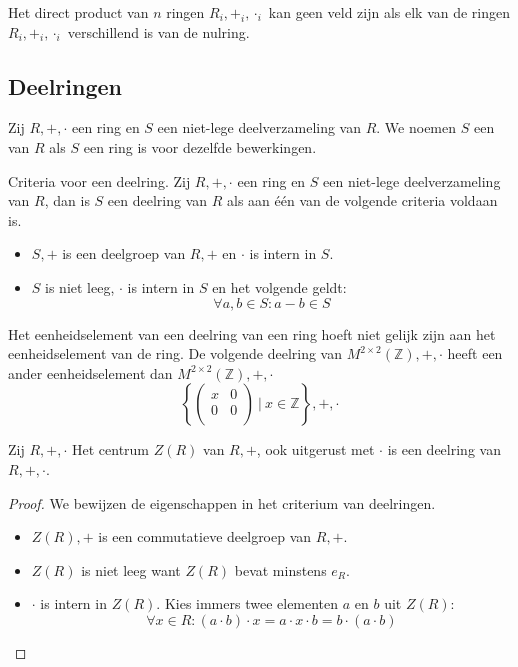 \documentclass[main.tex]{subfiles}
\begin{document}
\begin{st}
  Het direct product van $n$ ringen $R_{i},+_{i},\cdot_{i}$ kan geen veld zijn als elk van de ringen $R_{i},+_{i},\cdot_{i}$ verschillend is van de nulring.
\end{st}

\subsection{Deelringen}
\label{sec:deelringen}

\begin{de}
  Zij $R,+,\cdot$ een ring en $S$ een niet-lege deelverzameling van $R$.
  We noemen $S$ een  van $R$ als $S$ een ring is voor dezelfde bewerkingen.
\end{de}

\begin{st}
  \label{st:deelring-criteria}
  Criteria voor een deelring.
  Zij $R,+,\cdot$ een ring en $S$ een niet-lege deelverzameling van $R$, dan is $S$ een deelring van $R$ als aan \'e\'en van de volgende criteria voldaan is.
  \begin{itemize}
  \item $S,+$ is een deelgroep van $R,+$ en $\cdot$ is intern in $S$.
  \item $S$ is niet leeg, $\cdot$ is intern in $S$ en het volgende geldt:
    \[ \forall a,b \in S: a - b \in S \]
  \end{itemize}
\end{st}

\begin{opm}
  Het eenheidselement van een deelring van een ring hoeft niet gelijk zijn aan het eenheidselement van de ring.
  De volgende deelring van $M^{2\times 2}(\mathbb{Z}),+,\cdot$ heeft een ander eenheidselement dan $M^{2\times 2}(\mathbb{Z}),+,\cdot$ 
  \[
  \left\{
    \begin{pmatrix}
      x & 0\\
      0 & 0\\
    \end{pmatrix}
  \ |\ x \in \mathbb{Z}
  \right\},+,\cdot
  \]
\end{opm}

\begin{st}
  Zij $R,+,\cdot$
  Het centrum $Z(R)$ van $R,+$, ook uitgerust met $\cdot$ is een deelring van $R,+,\cdot$.
  \begin{proof}
    We bewijzen de eigenschappen in het criterium van deelringen.
    \begin{itemize}
    \item $Z(R),+$ is een commutatieve deelgroep van $R,+$.
    \item $Z(R)$ is niet leeg want $Z(R)$ bevat minstens $e_{R}$.
    \item $\cdot$ is intern in $Z(R)$.
      Kies immers twee elementen $a$ en $b$ uit $Z(R)$:
      \[ \forall x\in R: (a\cdot b) \cdot x = a \cdot x \cdot b = b \cdot (a \cdot b) \]
    \end{itemize}
  \end{proof}
\end{st}
\end{document}

